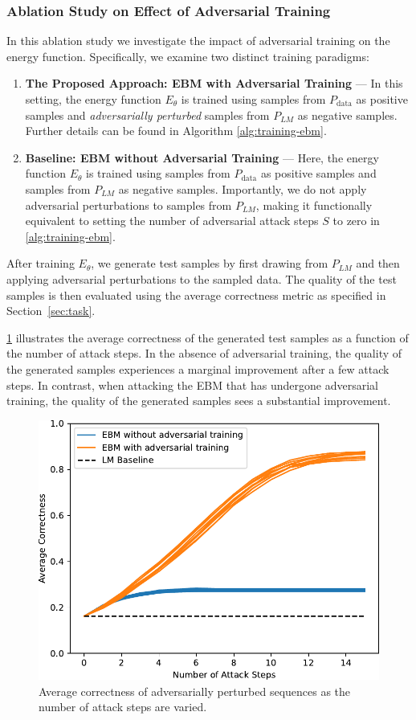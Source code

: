 \documentclass[11pt]{article}
\begin{document}
\subsubsection{Ablation Study on Effect of Adversarial Training}
  In this ablation study we investigate the impact of adversarial training on the energy function. Specifically, we examine two distinct training paradigms:
  \begin{enumerate}
    \item \textbf{The Proposed Approach: EBM with Adversarial Training} ---
    In this setting, the energy function \(E_\theta\) is trained using samples from \(P_\text{data}\) as positive samples and \emph{adversarially perturbed} samples from \(P_{LM}\) as negative samples. Further details can be found in Algorithm \ref{alg:training-ebm}.
    \item \textbf{Baseline: EBM without Adversarial Training} --- 
    Here, the energy function \(E_\theta\) is trained using samples from \(P_\text{data}\) as positive samples and samples from \(P_{LM}\) as negative samples. Importantly, we do not apply adversarial perturbations to samples from \(P_{LM}\), making it functionally equivalent to setting the number of adversarial attack steps \(S\) to zero in \cref{alg:training-ebm}.
  \end{enumerate}
  After training \( E_\theta \), we generate test samples by first drawing from \( P_{LM} \) and then applying adversarial perturbations to the sampled data. The quality of the test samples is then evaluated using the average correctness metric as specified in Section~\ref{sec:task}.
  
  \cref{fig:correct_curve} illustrates the average correctness of the generated test samples as a function of the number of attack steps. In the absence of adversarial training, the quality of the generated samples experiences a marginal improvement after a few attack steps. In contrast, when attacking the EBM that has undergone adversarial training, the quality of the generated samples sees a substantial improvement.
  
  \begin{figure}[H]
      \centering
      \includegraphics[width=0.8\linewidth]{correct_curve}
      \caption{Average correctness of adversarially perturbed sequences as the number of  attack steps are varied.}
      \label{fig:correct_curve}
  \end{figure}
\end{document}
